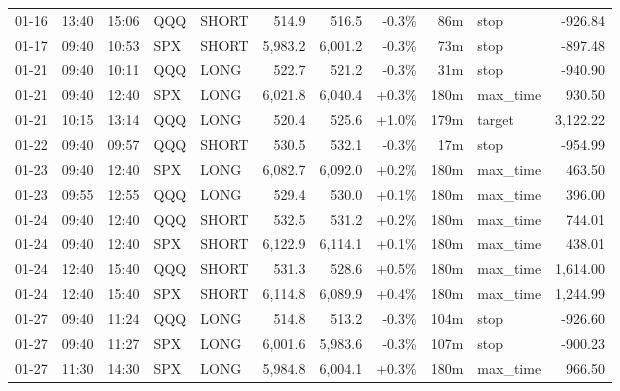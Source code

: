 \documentclass[11pt,a4paper,twoside]{article}
\begin{document}
\begin{center}
\begin{longtable}{>{\color{txtmain}}l l l l l r r r r >{\color{txtmain}}l r}
01-16 & 13:40 & 15:06 & QQQ & SHORT & 514.9 & 516.5 & \textcolor{lossred}{-0.3\%} & 86m & stop & \textcolor{lossred}{-926.84} \\
01-17 & 09:40 & 10:53 & SPX & SHORT & 5,983.2 & 6,001.2 & \textcolor{lossred}{-0.3\%} & 73m & stop & \textcolor{lossred}{-897.48} \\
01-21 & 09:40 & 10:11 & QQQ & LONG & 522.7 & 521.2 & \textcolor{lossred}{-0.3\%} & 31m & stop & \textcolor{lossred}{-940.90} \\
01-21 & 09:40 & 12:40 & SPX & LONG & 6,021.8 & 6,040.4 & \textcolor{wingreen}{+0.3\%} & 180m & max\_time & \textcolor{wingreen}{930.50} \\
01-21 & 10:15 & 13:14 & QQQ & LONG & 520.4 & 525.6 & \textcolor{wingreen}{+1.0\%} & 179m & target & \textcolor{wingreen}{3,122.22} \\
01-22 & 09:40 & 09:57 & QQQ & SHORT & 530.5 & 532.1 & \textcolor{lossred}{-0.3\%} & 17m & stop & \textcolor{lossred}{-954.99} \\
01-23 & 09:40 & 12:40 & SPX & LONG & 6,082.7 & 6,092.0 & \textcolor{wingreen}{+0.2\%} & 180m & max\_time & \textcolor{wingreen}{463.50} \\
01-23 & 09:55 & 12:55 & QQQ & LONG & 529.4 & 530.0 & \textcolor{wingreen}{+0.1\%} & 180m & max\_time & \textcolor{wingreen}{396.00} \\
01-24 & 09:40 & 12:40 & QQQ & SHORT & 532.5 & 531.2 & \textcolor{wingreen}{+0.2\%} & 180m & max\_time & \textcolor{wingreen}{744.01} \\
01-24 & 09:40 & 12:40 & SPX & SHORT & 6,122.9 & 6,114.1 & \textcolor{wingreen}{+0.1\%} & 180m & max\_time & \textcolor{wingreen}{438.01} \\
01-24 & 12:40 & 15:40 & QQQ & SHORT & 531.3 & 528.6 & \textcolor{wingreen}{+0.5\%} & 180m & max\_time & \textcolor{wingreen}{1,614.00} \\
01-24 & 12:40 & 15:40 & SPX & SHORT & 6,114.8 & 6,089.9 & \textcolor{wingreen}{+0.4\%} & 180m & max\_time & \textcolor{wingreen}{1,244.99} \\
01-27 & 09:40 & 11:24 & QQQ & LONG & 514.8 & 513.2 & \textcolor{lossred}{-0.3\%} & 104m & stop & \textcolor{lossred}{-926.60} \\
01-27 & 09:40 & 11:27 & SPX & LONG & 6,001.6 & 5,983.6 & \textcolor{lossred}{-0.3\%} & 107m & stop & \textcolor{lossred}{-900.23} \\
01-27 & 11:30 & 14:30 & SPX & LONG & 5,984.8 & 6,004.1 & \textcolor{wingreen}{+0.3\%} & 180m & max\_time & \textcolor{wingreen}{966.50} \\

\end{longtable}
\end{center}
\end{document}
